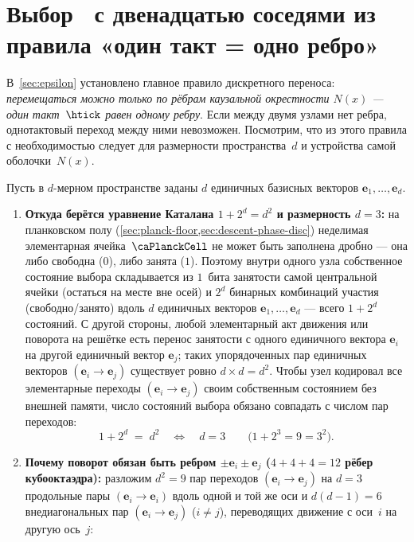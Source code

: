 \section{Выбор \latGCKgen\ с двенадцатью соседями из правила «один такт = одно ребро»}
\label{sec:fcc-choice}

В~\cref{sec:epsilon} установлено главное правило дискретного переноса: \emph{перемещаться можно только по рёбрам каузальной окрестности $N(x)$ --- один такт~$\htick$ равен одному ребру}. Если между двумя узлами нет ребра, однотактовый переход между ними невозможен. Посмотрим, что из этого правила с необходимостью следует для размерности пространства~$d$ и устройства самой оболочки~$N(x)$.

Пусть в $d$-мерном пространстве заданы $d$ единичных базисных векторов $\mathbf{e}_1,\dots,\mathbf{e}_d$.
\begin{enumerate}
\item \textbf{Откуда берётся уравнение Каталана $1+2^d=d^2$ и размерность $d=3$:}
  на планковском полу (\cref{sec:planck-floor,sec:descent-phase-disc}) неделимая элементарная ячейка~$\caPlanckCell$ не может быть заполнена дробно --- она либо свободна ($0$), либо занята ($1$). Поэтому внутри одного узла собственное состояние выбора складывается из $1$~бита занятости самой центральной ячейки (остаться на месте вне осей) и $2^d$ бинарных комбинаций участия (свободно/занято) вдоль $d$ единичных векторов $\mathbf{e}_1,\dots,\mathbf{e}_d$ --- всего $1+2^d$ состояний. С другой стороны, любой элементарный акт движения или поворота на решётке есть перенос занятости с одного единичного вектора $\mathbf{e}_i$ на другой единичный вектор $\mathbf{e}_j$; таких упорядоченных пар единичных векторов $(\mathbf{e}_i\to\mathbf{e}_j)$ существует ровно $d\times d = d^2$. Чтобы узел кодировал все элементарные переходы $(\mathbf{e}_i\to\mathbf{e}_j)$ своим собственным состоянием без внешней памяти, число состояний выбора обязано совпадать с числом пар переходов:
  \begin{equation}
    \label{eq:catalan-from-edges}
    1 + 2^d \;=\; d^2 \quad\Longleftrightarrow\quad d = 3 \qquad \bigl(1 + 2^3 = 9 = 3^2\bigr).
  \end{equation}
\item \textbf{Почему поворот обязан быть ребром $\pm\mathbf{e}_i\pm\mathbf{e}_j$ ($4+4+4=12$ рёбер кубооктаэдра):}
  разложим $d^2=9$ пар переходов $(\mathbf{e}_i\to\mathbf{e}_j)$ на $d=3$ продольные пары $(\mathbf{e}_i\to\mathbf{e}_i)$ вдоль одной и той же оси и $d(d-1)=6$ внедиагональных пар $(\mathbf{e}_i\to\mathbf{e}_j)$ ($i\ne j$), переводящих движение с оси~$i$ на другую ось~$j$:

\end{enumerate}

